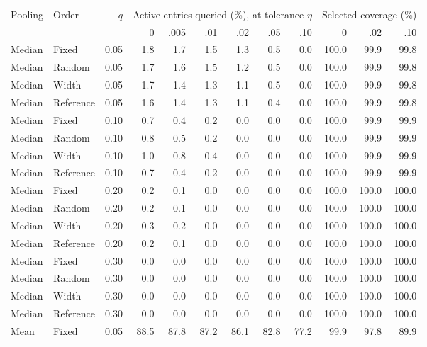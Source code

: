 \begin{table}[t]
\centering\small\setlength{\tabcolsep}{3pt}
\begin{tabular}{llrrrrrrrrrr}
\toprule
Pooling & Order & $q$ & \multicolumn{6}{c}{Active entries queried (\%), at tolerance $\eta$} & \multicolumn{3}{c}{Selected coverage (\%)} \\
\cmidrule(lr){4-9}\cmidrule(lr){10-12}
 & & & 0 & .005 & .01 & .02 & .05 & .10 & 0 & .02 & .10 \\
\midrule
Median & Fixed & 0.05 & 1.8 & 1.7 & 1.5 & 1.3 & 0.5 & 0.0 & 100.0 & 99.9 & 99.8 \\
Median & Random & 0.05 & 1.7 & 1.6 & 1.5 & 1.2 & 0.5 & 0.0 & 100.0 & 99.9 & 99.8 \\
Median & Width & 0.05 & 1.7 & 1.4 & 1.3 & 1.1 & 0.5 & 0.0 & 100.0 & 99.9 & 99.8 \\
Median & Reference & 0.05 & 1.6 & 1.4 & 1.3 & 1.1 & 0.4 & 0.0 & 100.0 & 99.9 & 99.8 \\
\addlinespace
Median & Fixed & 0.10 & 0.7 & 0.4 & 0.2 & 0.0 & 0.0 & 0.0 & 100.0 & 99.9 & 99.9 \\
Median & Random & 0.10 & 0.8 & 0.5 & 0.2 & 0.0 & 0.0 & 0.0 & 100.0 & 99.9 & 99.9 \\
Median & Width & 0.10 & 1.0 & 0.8 & 0.4 & 0.0 & 0.0 & 0.0 & 100.0 & 99.9 & 99.9 \\
Median & Reference & 0.10 & 0.7 & 0.4 & 0.2 & 0.0 & 0.0 & 0.0 & 100.0 & 99.9 & 99.9 \\
\addlinespace
Median & Fixed & 0.20 & 0.2 & 0.1 & 0.0 & 0.0 & 0.0 & 0.0 & 100.0 & 100.0 & 100.0 \\
Median & Random & 0.20 & 0.2 & 0.1 & 0.0 & 0.0 & 0.0 & 0.0 & 100.0 & 100.0 & 100.0 \\
Median & Width & 0.20 & 0.3 & 0.2 & 0.0 & 0.0 & 0.0 & 0.0 & 100.0 & 100.0 & 100.0 \\
Median & Reference & 0.20 & 0.2 & 0.1 & 0.0 & 0.0 & 0.0 & 0.0 & 100.0 & 100.0 & 100.0 \\
\addlinespace
Median & Fixed & 0.30 & 0.0 & 0.0 & 0.0 & 0.0 & 0.0 & 0.0 & 100.0 & 100.0 & 100.0 \\
Median & Random & 0.30 & 0.0 & 0.0 & 0.0 & 0.0 & 0.0 & 0.0 & 100.0 & 100.0 & 100.0 \\
Median & Width & 0.30 & 0.0 & 0.0 & 0.0 & 0.0 & 0.0 & 0.0 & 100.0 & 100.0 & 100.0 \\
Median & Reference & 0.30 & 0.0 & 0.0 & 0.0 & 0.0 & 0.0 & 0.0 & 100.0 & 100.0 & 100.0 \\
\addlinespace
\midrule
Mean & Fixed & 0.05 & 88.5 & 87.8 & 87.2 & 86.1 & 82.8 & 77.2 & 99.9 & 97.8 & 89.9 \\

\end{tabular}
\end{table}
